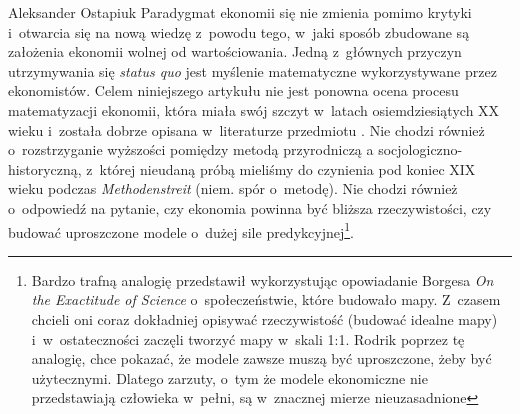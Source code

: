 \begin{artplenv}{Aleksander Ostapiuk}
Paradygmat ekonomii się nie zmienia pomimo krytyki i~otwarcia się na nową wiedzę z~powodu tego, w~jaki sposób zbudowane
są założenia ekonomii wolnej od wartościowania. Jedną z~głównych przyczyn utrzymywania się \textit{status quo }jest
myślenie matematyczne wykorzystywane przez ekonomistów. Celem niniejszego artykułu nie jest ponowna ocena procesu
matematyzacji ekonomii, która miała swój szczyt w~latach osiemdziesiątych XX wieku i~została dobrze
opisana w~literaturze przedmiotu
\parencite{beed_what_1991,debreu_mathematization_1991,weintraub_how_2002,mirowski_machine_2002,ostapiuk_matematyzacja_2017}.
Nie chodzi również o~rozstrzyganie wyższości pomiędzy metodą przyrodniczą a
socjologiczno-historyczną, z~której nieudaną próbą mieliśmy do czynienia pod koniec XIX wieku podczas
\textit{Methodenstreit} (niem. spór o~metodę). Nie chodzi również o~odpowiedź na pytanie, czy ekonomia powinna być
bliższa rzeczywistości, czy budować uproszczone modele o~dużej sile predykcyjnej\footnote{Bardzo trafną analogię
przedstawił
\parencite[s.~43–44]{rodrik_economics_2015}
wykorzystując opowiadanie Borgesa \textit{On the
Exactitude of Science} o~społeczeństwie, które budowało mapy. Z~czasem chcieli oni coraz dokładniej opisywać
rzeczywistość (budować idealne mapy) i~w~ostateczności zaczęli tworzyć mapy w~skali 1:1. Rodrik poprzez tę analogię,
chce pokazać, że modele zawsze muszą być uproszczone, żeby być użytecznymi. Dlatego zarzuty, o~tym że modele
ekonomiczne nie przedstawiają człowieka w~pełni, są w~znacznej mierze nieuzasadnione}.


\end{artplenv}
